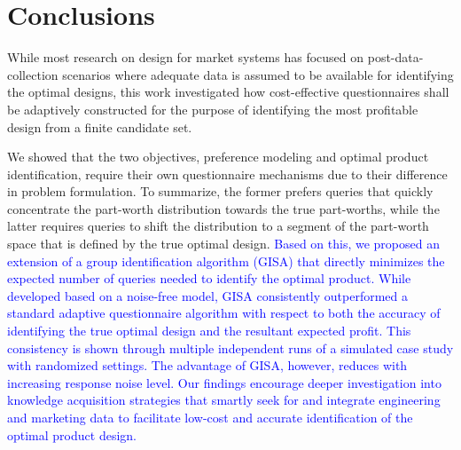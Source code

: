 \documentclass[onecolumn,11pt]{article}
\newcommand{\highlight}[1]{{\textcolor{blue}{{#1}}}}
\newcommand{\highlight}[1]{{{#1}}}
\newcommand{\cutsectionup}{\vspace*{-0.1in}}
\newcommand{\cutsectionup}{}
\begin{document}
\cutsectionup
\section{Conclusions}
\label{sec:conclusion}
While most research on design for market systems has focused on post-data-collection
scenarios where adequate data is assumed to be available for identifying the
optimal designs, this work investigated how cost-effective questionnaires shall
be adaptively constructed for the purpose of identifying the most profitable design from a finite candidate set. 

We showed that the two objectives, preference modeling and optimal product identification, require their own questionnaire mechanisms due to their difference in problem formulation. To summarize, the former prefers queries that quickly concentrate the part-worth distribution towards the true part-worths, while the latter requires queries to shift the distribution to a segment of the part-worth space that is defined by the true optimal design. \highlight{Based on this, we proposed an extension of a group identification algorithm (GISA) that directly minimizes the expected number of queries needed to identify the optimal product. While developed based on a noise-free model, GISA consistently outperformed a standard adaptive questionnaire algorithm with respect to both
the accuracy of identifying the true optimal design and the resultant expected profit. This consistency is shown through multiple independent runs of a simulated case study with randomized settings. The advantage of GISA, however, reduces with increasing response noise level. Our findings encourage deeper investigation into knowledge acquisition strategies that smartly seek for and integrate engineering and marketing data to facilitate low-cost and accurate identification of the optimal product design.}

\end{document}
